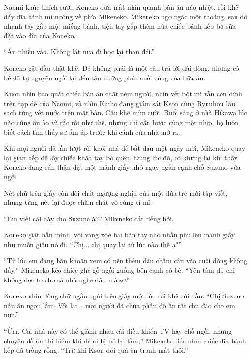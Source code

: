 ﻿\documentclass[../main.tex]{subfiles}
\begin{document}
Naomi khúc khích cười. Koneko đưa mắt nhìn quanh bàn ăn náo nhiệt, rồi khẽ đẩy đĩa bánh mì nướng về phía Mikeneko. Mikeneko ngơ ngác một thoáng, sau đó nhanh tay gắp một miếng bánh, tiện tay gắp thêm nửa chiếc bánh kếp bơ sữa đặt vào đĩa của Koneko.

``Ăn nhiều vào. Không lát nữa đi học lại than đói.''

Koneko gật đầu thật khẽ. Đó không phải là một câu trả lời dài dòng, nhưng cô bé đã tự nguyện ngồi lại đến tận những phút cuối cùng của bữa ăn.

Kuon nhìn bao quát chiếc bàn ăn chật nêm người, nhìn vết bột mì vẫn còn dính trên tạp dề của Naomi, và nhìn Kaiho đang giám sát Kson cùng Ryuuhou lau sạch từng vệt nước trên mặt bàn. Cậu khẽ mỉm cười. Buổi sáng ở nhà Hikawa lúc nào cũng ồn ào và rắc rối như thế, nhưng chỉ cần bước cùng một nhịp, họ luôn biết cách tìm thấy sự ấm áp trước khi cánh cửa nhà mở ra.

\omk

Khi mọi người đã lần lượt rời khỏi nhà để bắt đầu một ngày mới, Mikeneko quay lại gian bếp để lấy chiếc khăn tay bỏ quên. Đúng lúc đó, cô khựng lại khi thấy Koneko đang cẩn thận đặt một mảnh giấy nhỏ ngay ngắn cạnh chỗ Suzuno vừa ngồi.

Nét chữ trên giấy còn đôi chút ngượng nghịu của một đứa trẻ mới tập viết, nhưng từng nét lại được chăm chút vô cùng tỉ mỉ:


``Em viết cái này cho Suzuno à?'' Mikeneko cất tiếng hỏi.

Koneko giật bắn mình, vội vàng xòe hai bàn tay nhỏ nhắn phủ lên mảnh giấy như muốn giấu nó đi. ``Chị... chị quay lại từ lúc nào thế ạ?''

``Từ lúc em đang băn khoăn xem có nên thêm dấu chấm câu vào cuối dòng không đấy,'' Mikeneko kéo chiếc ghế gỗ ngồi xuống bên cạnh cô bé. ``Yên tâm đi, chị không đọc to cho cả nhà nghe đâu mà sợ.''

Koneko nhìn dòng chữ ngắn ngủi trên giấy một lúc rồi khẽ cúi đầu: ``Chị Suzuno nấu ăn ngon lắm. Với lại... mọi người đã chừa phần đồ ăn rất chu đáo cho em nữa.''

``Ừm. Cái nhà này có thể giành nhau cái điều khiển TV hay chỗ ngồi, nhưng chuyện đồ ăn thì hiếm khi để ai bị bỏ lại lắm,'' Mikeneko liếc nhìn chiếc đĩa bánh kếp đã trống rỗng. ``Trừ khi Kson đói quá ăn tranh mất thôi.''
\end{document}
